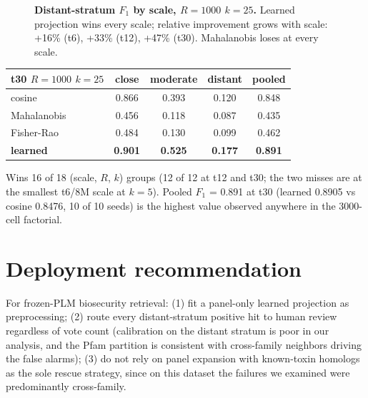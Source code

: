 \documentclass[11pt]{article}
\begin{document}
\begin{figure}[h]\centering
{}
\caption{\textbf{Distant-stratum $F_1$ by scale, $R=1000$ $k=25$.} Learned projection wins every scale; relative improvement grows with scale: +16\% (t6), +33\% (t12), +47\% (t30). Mahalanobis loses at every scale.}\label{fig:rescue}
\end{figure}

\begin{center}\small
\begin{tabular}{lccc|c}
\toprule
t30 $R{=}1000$ $k{=}25$ & close & moderate & distant & pooled \\
\midrule
cosine & 0.866 & 0.393 & 0.120 & 0.848 \\
Mahalanobis & 0.456 & 0.118 & 0.087 & 0.435 \\
Fisher-Rao & 0.484 & 0.130 & 0.099 & 0.462 \\
\textbf{learned} & \textbf{0.901} & \textbf{0.525} & \textbf{0.177} & \textbf{0.891} \\
\bottomrule
\end{tabular}
\end{center}

Wins 16 of 18 (scale, $R$, $k$) groups (12 of 12 at t12 and t30; the two misses are at the smallest t6/8M scale at $k=5$). Pooled $F_1$ = 0.891 at t30 (learned 0.8905 vs cosine 0.8476, 10 of 10 seeds) is the highest value observed anywhere in the 3000-cell factorial.

\section{Deployment recommendation}
For frozen-PLM biosecurity retrieval: (1) fit a panel-only learned projection as preprocessing; (2) route every distant-stratum positive hit to human review regardless of vote count (calibration on the distant stratum is poor in our analysis, and the Pfam partition is consistent with cross-family neighbors driving the false alarms); (3) do not rely on panel expansion with known-toxin homologs as the sole rescue strategy, since on this dataset the failures we examined were predominantly cross-family.
\end{document}

